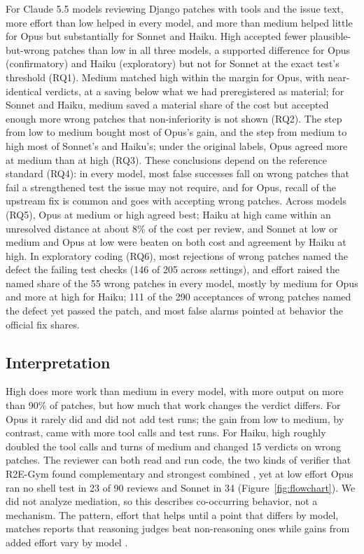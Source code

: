 \documentclass[sigconf,nonacm]{acmart}
\begin{document}
For Claude 5.5 models reviewing Django patches with tools and the issue text, more effort than low helped in every model, and more than medium helped little for Opus but substantially for Sonnet and Haiku. High accepted fewer plausible-but-wrong patches than low in all three models, a supported difference for Opus (confirmatory) and Haiku (exploratory) but not for Sonnet at the exact test's threshold (RQ1). Medium matched high within the margin for Opus, with near-identical verdicts, at a saving below what we had preregistered as material; for Sonnet and Haiku, medium saved a material share of the cost but accepted enough more wrong patches that non-inferiority is not shown (RQ2). The step from low to medium bought most of Opus's gain, and the step from medium to high most of Sonnet's and Haiku's; under the original labels, Opus agreed more at medium than at high (RQ3). These conclusions depend on the reference standard (RQ4): in every model, most false successes fall on wrong patches that fail a strengthened test the issue may not require, and for Opus, recall of the upstream fix is common and goes with accepting wrong patches. Across models (RQ5), Opus at medium or high agreed best; Haiku at high came within an unresolved distance at about 8\% of the cost per review, and Sonnet at low or medium and Opus at low were beaten on both cost and agreement by Haiku at high. In exploratory coding (RQ6), most rejections of wrong patches named the defect the failing test checks (146 of 205 across settings), and effort raised the named share of the 55 wrong patches in every model, mostly by medium for Opus and more at high for Haiku; 111 of the 290 acceptances of wrong patches named the defect yet passed the patch, and most false alarms pointed at behavior the official fix shares.

\subsection{Interpretation}\label{sec:interpretation}

High does more work than medium in every model, with more output on more than 90\% of patches, but how much that work changes the verdict differs. For Opus it rarely did and did not add test runs; the gain from low to medium, by contrast, came with more tool calls and test runs. For Haiku, high roughly doubled the tool calls and turns of medium and changed 15 verdicts on wrong patches. The reviewer can both read and run code, the two kinds of verifier that R2E-Gym found complementary and strongest combined \cite{jain2025r2egym}, yet at low effort Opus ran no shell test in 23 of 90 reviews and Sonnet in 34 (Figure~\ref{fig:flowchart}). We did not analyze mediation, so this describes co-occurring behavior, not a mechanism. The pattern, effort that helps until a point that differs by model, matches reports that reasoning judges beat non-reasoning ones \cite{jiang2026codejudgebench} while gains from added effort vary by model \cite{huang2025judge}.
\end{document}
